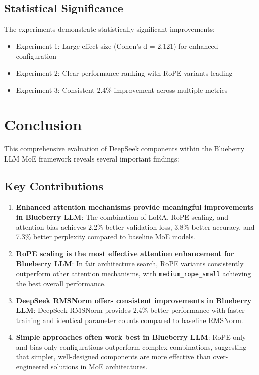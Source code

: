 \documentclass[11pt,a4paper]{article}
\begin{document}
\subsection{Statistical Significance}

The experiments demonstrate statistically significant improvements:
\begin{itemize}
    \item Experiment 1: Large effect size (Cohen's d = 2.121) for enhanced configuration
    \item Experiment 2: Clear performance ranking with RoPE variants leading
    \item Experiment 3: Consistent 2.4\% improvement across multiple metrics
\end{itemize}

\section{Conclusion}

This comprehensive evaluation of DeepSeek components within the Blueberry LLM MoE framework reveals several important findings:

\subsection{Key Contributions}

\begin{enumerate}
    \item \textbf{Enhanced attention mechanisms provide meaningful improvements in Blueberry LLM}: The combination of LoRA, RoPE scaling, and attention bias achieves 2.2\% better validation loss, 3.8\% better accuracy, and 7.3\% better perplexity compared to baseline MoE models.
    
    \item \textbf{RoPE scaling is the most effective attention enhancement for Blueberry LLM}: In fair architecture search, RoPE variants consistently outperform other attention mechanisms, with \texttt{medium\_rope\_small} achieving the best overall performance.
    
    \item \textbf{DeepSeek RMSNorm offers consistent improvements in Blueberry LLM}: DeepSeek RMSNorm provides 2.4\% better performance with faster training and identical parameter counts compared to baseline RMSNorm.
    
    \item \textbf{Simple approaches often work best in Blueberry LLM}: RoPE-only and bias-only configurations outperform complex combinations, suggesting that simpler, well-designed components are more effective than over-engineered solutions in MoE architectures.
\end{enumerate}
\end{document}
